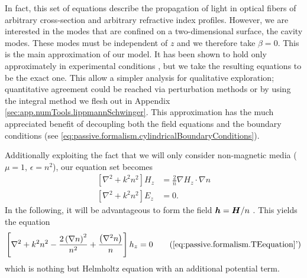 
In fact, this set of equations describe the propagation of light 
in optical fibers of arbitrary cross-section and arbitrary
refractive index profiles. However, we are interested in the modes
that are confined on a two-dimensional surface, the cavity modes. 
These modes must be independent of $z$ and we therefore take 
$\beta=0$. This is the main approximation of our model. It has been shown
to hold only approximately in experimental conditions \cite{DUB2008,BIT2010}, 
but we take the resulting equations to be the exact one. This allow a 
simpler analysis for qualitative exploration; quantitative agreement
could be reached via perturbation methods or by using the integral method
we flesh out in Appendix \ref{sec:app.numTools.lippmannSchwinger}. This approximation 
has the much appreciated benefit of decoupling both the field
equations and the boundary conditions (see \eqref{eq:passive.formalism.cylindricalBoundaryConditions}).

Additionally exploiting the fact that we will only consider
non-magnetic media ($\mu=1$, $\epsilon=n^2$), our equation set becomes
  \begin{subequations}
  \label{eq:passive.formalism.fieldEquations}
  \begin{align}
    \left[\nabla^2+k^2n^2\right] H_z	&= \frac{2}{n}\nabla H_z\cdot\nabla n	\label{eq:passive.formalism.TEequation}\\
    \left[\nabla^2+k^2n^2\right] E_z	&= 0. 
  \end{align}
  \end{subequations}
In the following, it will be advantageous to form the field
$\boldsymbol{h}=\boldsymbol{H}/n$ \cite{DET2009}. This yields the equation
\cite{DET2009, GAP2013a}
  \begin{equation}
   \left[\nabla^2+k^2n^2-\frac{2\left(\nabla n\right)^2}{n^2}+\frac{\left(\nabla^2n\right)}{n}\right]h_z=0 \tag{\ref{eq:passive.formalism.TEequation}'}
   \label{eq:passive.formalism.TEequationPrime}
  \end{equation}
which is nothing but Helmholtz equation with an additional potential term.

